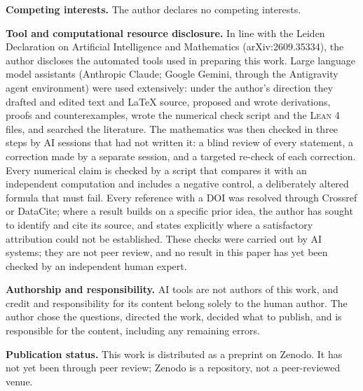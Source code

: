 \documentclass[11pt,reqno]{amsart}
\theoremstyle{definition}
\begin{document}
\medskip\noindent\textbf{Competing interests.} The author declares no competing
interests.

\medskip\noindent\textbf{Tool and computational resource disclosure.} In line with
the Leiden Declaration on Artificial Intelligence and Mathematics
(arXiv:2609.35334), the author discloses the automated tools used in preparing
this work. Large language model assistants (Anthropic Claude; Google Gemini,
through the Antigravity agent environment) were used extensively: under the
author's direction they drafted and edited text and \LaTeX{} source, proposed and
wrote derivations, proofs and counterexamples, wrote the numerical check script
and the \textsc{Lean 4} files, and searched the literature. The mathematics was
then checked in three steps by AI sessions that had not written it: a blind
review of every statement, a correction made by a separate session, and a
targeted re-check of each correction. Every numerical claim is checked by a
script that compares it with an independent computation and includes a negative
control, a deliberately altered formula that must fail. Every reference with a
DOI was resolved through Crossref or DataCite; where a result builds on a
specific prior idea, the author has sought to identify and cite its source, and
states explicitly where a satisfactory attribution could not be established.
These checks were carried out by AI systems; they are not peer review, and no
result in this paper has yet been checked by an independent human expert.

\medskip\noindent\textbf{Authorship and responsibility.} AI tools are not
authors of this work, and credit and responsibility for its content belong
solely to the human author. The author chose the questions, directed the work,
decided what to publish, and is responsible for the content, including any
remaining errors.

\medskip\noindent\textbf{Publication status.} This work is distributed as a
preprint on Zenodo. It has not yet been through peer review; Zenodo is a
repository, not a peer-reviewed venue.
\end{document}
